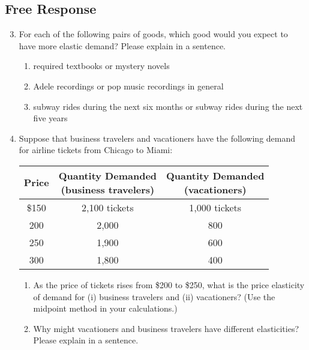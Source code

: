 \documentclass{article}
\begin{document}
\subsection*{Free Response}

\begin{enumerate}
\setcounter{enumi}{2}

\item For each of the following pairs of goods, which good would you expect to have more elastic demand? Please explain in a sentence.

	\begin{enumerate}
	
	\item required textbooks or mystery novels
	
	\item Adele recordings or pop music recordings in general
	
	\item subway rides during the next six months or subway rides during the next five years
	
	\end{enumerate}

\item Suppose that business travelers and vacationers have the following demand for airline tickets from Chicago to Miami:

	\begin{center}
	\begin{tabular}{c | c | c}
	\textbf{Price} & \makecell{\textbf{Quantity Demanded} \\ \textbf{(business travelers)}} & \makecell{\textbf{Quantity Demanded} \\ \textbf{(vacationers)}} \\
	\hline
	\$150 & 2,100 tickets & 1,000 tickets \\
	200 & 2,000 & 800 \\
	250 & 1,900 & 600 \\
	300 & 1,800 & 400 
	\end{tabular}
	\end{center}
	
	\begin{enumerate}
	
	\item As the price of tickets rises from \$200 to \$250, what is the price elasticity of demand for (i) business travelers and (ii) vacationers? (Use the midpoint method in your calculations.)
	
	\item Why might vacationers and business travelers have different elasticities? Please explain in a sentence.
	

\end{enumerate}
\end{enumerate}
\end{document}
